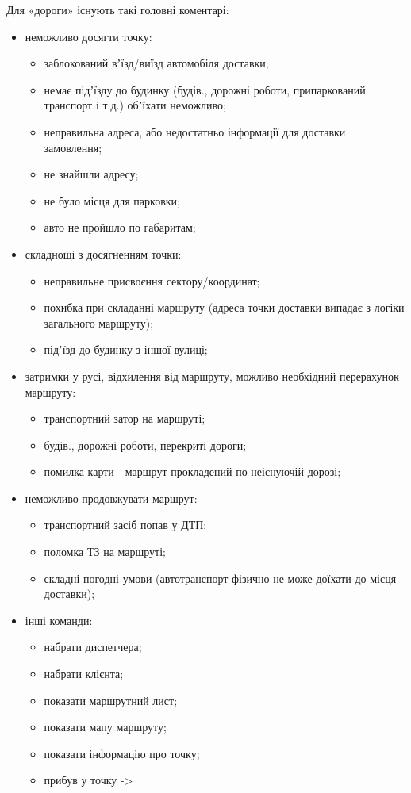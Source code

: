 Для «дороги» існують такі головні коментарі:
\begin{itemize}
	\item неможливо досягти точку:
	\begin{itemize}
		\item заблокований вʼїзд/виїзд автомобіля доставки;
		\item немає підʼїзду до будинку (будів., дорожні роботи, припаркований транспорт і т.д.) обʼїхати неможливо;
		\item неправильна адреса, або недостатньо інформації для доставки замовлення;
		\item не знайшли адресу;
		\item не було місця для парковки;
		\item авто не пройшло по габаритам;
	\end{itemize}
	\item складнощі з досягненням точки:
	\begin{itemize}
		\item неправильне присвоєння сектору/координат;
		\item похибка при складанні маршруту (адреса точки доставки випадає з логіки загального маршруту);
		\item підʼїзд до будинку з іншої вулиці;
	\end{itemize}
	\item затримки у русі, відхилення від маршруту, можливо необхідний перерахунок маршруту:
	\begin{itemize}
		\item транспортний затор на маршруті;
		\item будів., дорожні роботи, перекриті дороги;
		\item помилка карти - маршрут прокладений по неіснуючій дорозі;
	\end{itemize}
	\item неможливо продовжувати маршрут:
	\begin{itemize}
		\item транспортний засіб попав у ДТП;
		\item поломка ТЗ на маршруті;
		\item складні погодні умови (автотранспорт фізично не може доїхати до місця доставки);
	\end{itemize}
	\item інші команди:
	\begin{itemize}
		\item набрати диспетчера;
		\item набрати клієнта;
		\item показати маршрутний лист;
		\item показати мапу маршруту;
		\item показати інформацію про точку;
		\item прибув у точку ->
	\end{itemize}
\end{itemize}

